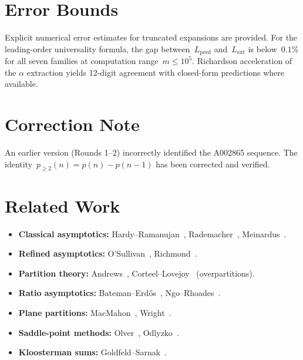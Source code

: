 \documentclass[11pt,a4paper]{article}
\begin{document}
\section{Error Bounds}\label{sec:errors}

Explicit numerical error estimates for truncated expansions are provided. For the leading-order universality formula, the gap between~$L_{\mathrm{pred}}$ and~$L_{\mathrm{ext}}$ is below~$0.1\%$ for all seven families at computation range~$m \leq 10^5$. Richardson acceleration of the $\alpha$ extraction yields 12-digit agreement with closed-form predictions where available.

\section{Correction Note}\label{sec:correction}

An earlier version (Rounds 1--2) incorrectly identified the A002865 sequence. The identity~$p_{\geq 2}(n) = p(n) - p(n-1)$ has been corrected and verified.

\section{Related Work}\label{sec:related}

\begin{itemize}
  \item \textbf{Classical asymptotics:} Hardy--Ramanujan~\cite{hardy1918}, Rademacher~\cite{rademacher1937}, Meinardus~\cite{meinardus1954}.
  \item \textbf{Refined asymptotics:} O'Sullivan~\cite{osullivan2015}, Richmond~\cite{richmond1975}.
  \item \textbf{Partition theory:} Andrews~\cite{andrews1976}, Corteel--Lovejoy~\cite{corteel2004} (overpartitions).
  \item \textbf{Ratio asymptotics:} Bateman--Erd\H{o}s~\cite{bateman1956}, Ngo--Rhoades~\cite{ngo2017}.
  \item \textbf{Plane partitions:} MacMahon~\cite{macmahon1912}, Wright~\cite{wright1931,wright1934}.
  \item \textbf{Saddle-point methods:} Olver~\cite{olver1974}, Odlyzko~\cite{odlyzko1995}.
  \item \textbf{Kloosterman sums:} Goldfeld--Sarnak~\cite{goldfeld1983}.
\end{itemize}
\end{document}

